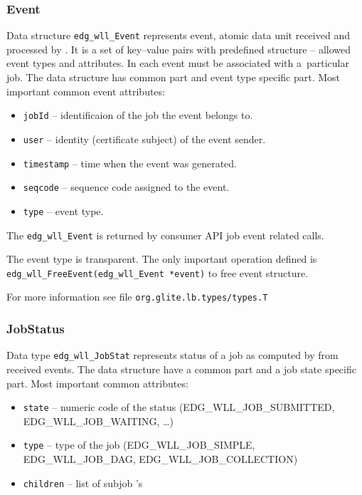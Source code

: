 \subsubsection{Event}
Data structure \verb'edg_wll_Event' represents \LB event, atomic
data unit received and processed by \LB. It is a set of key--value
pairs with predefined structure -- allowed event types and
attributes. In \LB each event must be associated with a~particular
job. The data structure has common part and event type specific
part. Most important common event attributes:
\begin{itemize}
  \item \texttt{jobId} -- identificaion of the job the event belongs to.
  \item \texttt{user} -- identity (certificate subject) of the event sender.
  \item \texttt{timestamp} -- time when the event was generated.
  \item \texttt{seqcode} -- sequence code assigned to the event.
  \item \texttt{type} -- event type.
\end{itemize}
The \verb'edg_wll_Event' is returned by consumer \LB API job
event related calls.

The event type is transparent. The only important operation defined is
\texttt{edg\_wll\_FreeEvent(edg\_wll\_Event *event)} to free event
structure. 

For more information see file \verb'org.glite.lb.types/types.T' 


\subsubsection{JobStatus}
Data type \texttt{edg\_wll\_JobStat} represents status of a job as
computed by \LB from received events. The data structure have a common
part and a job state specific part. Most important common
attributes:
\begin{itemize}
  \item \texttt{state} -- numeric code of the status
    (EDG\_WLL\_JOB\_SUBMITTED, EDG\_WLL\_JOB\_WAITING, \dots)
  \item \texttt{type} -- type of the job (EDG\_WLL\_JOB\_SIMPLE,
    EDG\_WLL\_JOB\_DAG, EDG\_WLL\_JOB\_COLLECTION) 
  \item \texttt{children} -- list of subjob \jobid's
\end{itemize}

